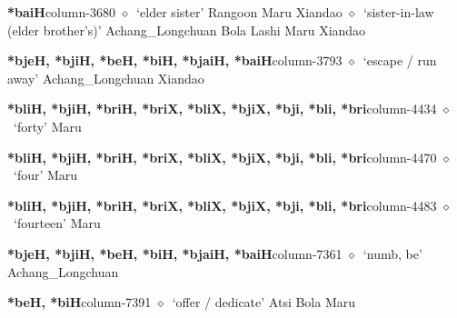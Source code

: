   \item {\footnotesize \textbf{*baiH}}{\tiny column-3680}
         $\diamond$~`elder sister'
         Rangoon 
\hspace{1ex}
         Maru 
\hspace{1ex}
         Xiandao 
\hspace{1ex}
         $\diamond$~`sister-in-law (elder brother's)'
         Achang\_Longchuan 
\hspace{1ex}
         Bola 
\hspace{1ex}
         Lashi 
\hspace{1ex}
         Maru 
\hspace{1ex}
         Xiandao 
  \item {\footnotesize \textbf{*bjeH, *bjiH, *beH, *biH, *bjaiH, *baiH}}{\tiny column-3793}
         $\diamond$~`escape / run away'
         Achang\_Longchuan 
\hspace{1ex}
         Xiandao 
  \item {\footnotesize \textbf{*bliH, *bjiH, *briH, *briX, *bliX, *bjiX, *bji, *bli, *bri}}{\tiny column-4434}
         $\diamond$~`forty'
         Maru 
  \item {\footnotesize \textbf{*bliH, *bjiH, *briH, *briX, *bliX, *bjiX, *bji, *bli, *bri}}{\tiny column-4470}
         $\diamond$~`four'
         Maru 
  \item {\footnotesize \textbf{*bliH, *bjiH, *briH, *briX, *bliX, *bjiX, *bji, *bli, *bri}}{\tiny column-4483}
         $\diamond$~`fourteen'
         Maru 
  \item {\footnotesize \textbf{*bjeH, *bjiH, *beH, *biH, *bjaiH, *baiH}}{\tiny column-7361}
         $\diamond$~`numb, be'
         Achang\_Longchuan 
  \item {\footnotesize \textbf{*beH, *biH}}{\tiny column-7391}
         $\diamond$~`offer / dedicate'
         Atsi 
\hspace{1ex}
         Bola 
\hspace{1ex}
         Maru 
